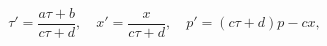 \begin{equation}\label{CT}
\tau'=\frac{a\tau+b}{c\tau+d},\quad x'=\frac{x}{c\tau+d},\quad
p'=(c\tau+d)p-cx,
\end{equation}

